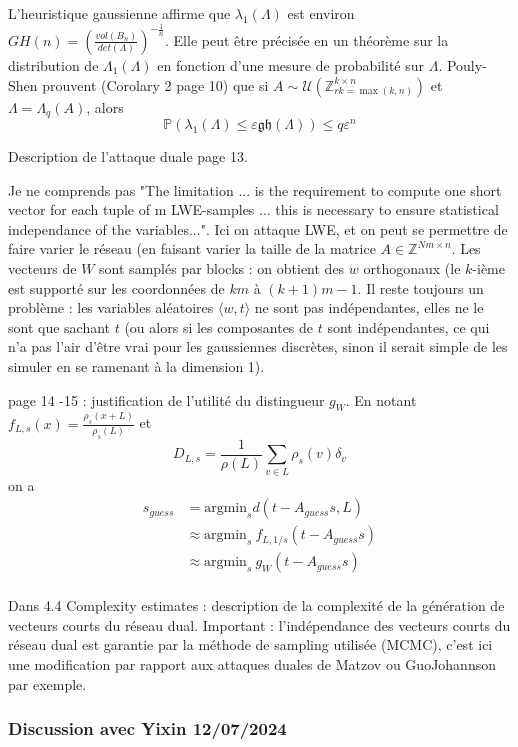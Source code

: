 \documentclass{article}
\begin{document}
L'heuristique gaussienne affirme que $\lambda_1(\Lambda)$ est environ $GH(n) = \left( \frac{vol(B_n)}{det(\Lambda)}\right)^{-\frac{1}{n}}$. Elle peut être précisée en un théorème sur la distribution de $\Lambda_1(\Lambda)$ en fonction d'une mesure de probabilité sur $\Lambda$. Pouly-Shen prouvent (Corolary 2 page 10) que si $A\sim \mathcal U(\mathbb Z^{k \times n}_{rk = \max (k,n)})$ et $\Lambda = \Lambda_q(A)$, alors
$$ \mathbb P\left( \lambda_1( \Lambda ) \leq \varepsilon \mathfrak{gh}(\Lambda) \right) \leq q\varepsilon^n  $$

Description de l'attaque duale page 13.

Je ne comprends pas "The limitation ... is the requirement to compute one short vector for each tuple of m LWE-samples ... this is necessary to ensure statistical independance of the variables...". Ici on attaque LWE, et on peut se permettre de faire varier le réseau (en faisant varier la taille de la matrice $A\in \mathbb Z^{Nm \times n}$. Les vecteurs de $W$ sont samplés par blocks : on obtient des $w$ orthogonaux (le $k$-ième est supporté sur les coordonnées de $km$  à $(k+1) m -1$. Il reste toujours un problème : les variables aléatoires $\langle w , t \rangle $ ne sont pas indépendantes, elles ne le sont que sachant $t$ (ou alors si les composantes de $t$ sont indépendantes, ce qui n'a pas l'air d'être vrai pour les gaussiennes discrètes, sinon il serait simple de les simuler en se ramenant à la dimension 1).  

page 14 -15 : justification de l'utilité du distingueur $g_W$. En notant $f_{L,s}(x) = \frac{\rho_s(x+L)}{\rho_s(L)}$ et 
$$D_{L , s}  =\frac{1}{\rho(L)}\sum_{v\in L} \rho_s (v)\delta_v$$ 
on a 
\[\begin{split}
s_{guess} & = \text{argmin}_s d(t - A_{guess} s , L ) \\
	& \approx \text{argmin}_s \  f_{L, 1/s}(t - A_{guess} s) \\
	& \approx \text{argmin}_s \ g_W(t - A_{guess} s ) \\
\end{split}\]

Dans 4.4 Complexity estimates : description de la complexité de la génération de vecteurs courts du réseau dual. Important : l'indépendance des vecteurs courts du réseau dual est garantie par la méthode de sampling utilisée (MCMC), c'est ici une modification par rapport aux attaques duales de Matzov ou GuoJohannson par exemple.

\subsubsection{Discussion avec Yixin 12/07/2024}
\end{document}
